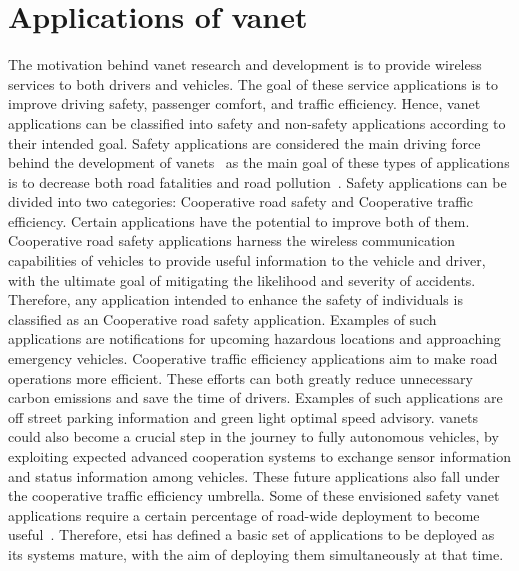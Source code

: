 \section[Applications of VANET]{Applications of \gls{vanet}}
\label{sec:Applications_of_VANETs}
The motivation behind \gls{vanet} research and development is to provide wireless services to both drivers and vehicles. The goal of these service applications is to improve driving safety, passenger comfort, and traffic efficiency. Hence, \gls{vanet} applications can be classified into safety and non-safety applications according to their intended goal.
Safety applications are considered the main driving force behind the development of \glspl{vanet}~\cite{liang_vehicular_2015} as the main goal of these types of applications is to decrease both road fatalities and road pollution~\cite{al-sultan_comprehensive_2014}. Safety applications can be divided into two categories: Cooperative road safety and Cooperative traffic efficiency. Certain applications have the potential to improve both of them.
Cooperative road safety applications harness the wireless communication capabilities of vehicles to provide useful information to the vehicle and driver, with the ultimate goal of mitigating the likelihood and severity of accidents. Therefore, any application intended to enhance the safety of individuals is classified as an Cooperative road safety application. Examples of such applications are notifications for upcoming hazardous locations and approaching emergency vehicles.
Cooperative traffic efficiency applications aim to make road operations more efficient. These efforts can both greatly reduce unnecessary carbon emissions and save the time of drivers. Examples of such applications are off street parking information and green light optimal speed advisory.
\glspl{vanet} could also become a crucial step in the journey to fully autonomous vehicles, by exploiting expected advanced cooperation systems to exchange sensor information and status information among vehicles. These future applications also fall under the cooperative traffic efficiency umbrella.
Some of these envisioned safety \gls{vanet} applications require a certain percentage of road-wide deployment to become useful~\cite{jakubiak_state_2008}. Therefore, \gls{etsi} has defined a basic set of applications to be deployed as \gls{its} systems mature, with the aim of deploying them simultaneously at that time. 
